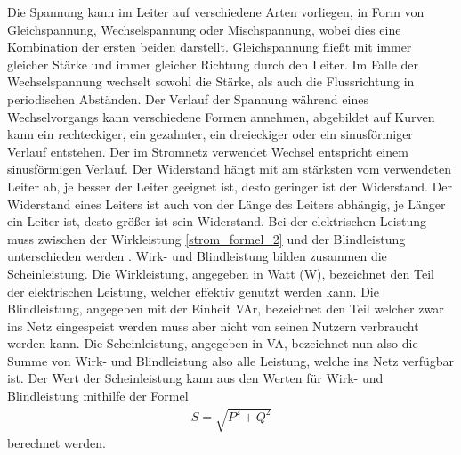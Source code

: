 Die Spannung kann im Leiter auf verschiedene Arten vorliegen, in Form von Gleichspannung, Wechselspannung oder Mischspannung, wobei dies eine Kombination der ersten beiden darstellt. Gleichspannung fließt mit immer gleicher Stärke und immer gleicher Richtung durch den Leiter. Im Falle der Wechselspannung wechselt sowohl die Stärke, als auch die Flussrichtung in periodischen Abständen. Der Verlauf der Spannung während eines Wechselvorgangs kann verschiedene Formen annehmen, abgebildet auf Kurven kann ein rechteckiger, ein gezahnter, ein dreieckiger oder ein sinusförmiger Verlauf entstehen. Der im Stromnetz verwendet Wechsel entspricht einem sinusförmigen Verlauf. Der Widerstand hängt mit am stärksten vom verwendeten Leiter ab, je besser der Leiter geeignet ist, desto geringer ist der Widerstand. Der Widerstand eines Leiters ist auch von der Länge des Leiters abhängig, je Länger ein Leiter ist, desto größer ist sein Widerstand. Bei der elektrischen Leistung muss zwischen der Wirkleistung \ref{strom_formel_2} und der Blindleistung unterschieden werden \cite{strom_leistung}. Wirk- und Blindleistung bilden zusammen die Scheinleistung. Die Wirkleistung, angegeben in Watt (W), bezeichnet den Teil der elektrischen Leistung, welcher effektiv genutzt werden kann. Die Blindleistung, angegeben mit der Einheit VAr, bezeichnet den Teil welcher zwar ins Netz eingespeist werden muss aber nicht von seinen Nutzern verbraucht werden kann. Die Scheinleistung, angegeben in VA, bezeichnet nun also die Summe von Wirk- und Blindleistung also alle Leistung, welche ins Netz verfügbar ist. Der Wert der Scheinleistung kann aus den Werten für Wirk- und Blindleistung mithilfe der Formel
\begin{align}
	S = \sqrt{P^{2}+Q^{2}}
	\label{strom_formel_3}
\end{align}
berechnet werden.

 \cite{spannung_1} \cite{stromstaerke_1}

